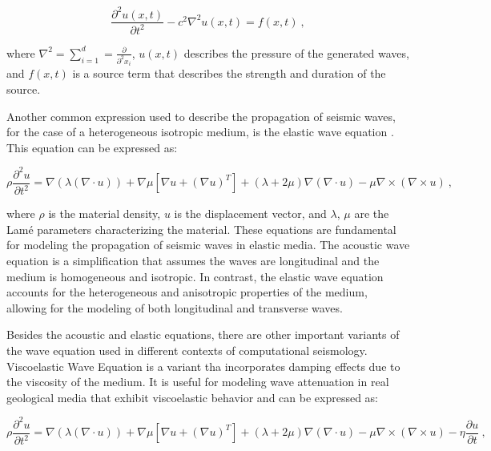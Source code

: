 \documentclass[11pt,twoside]{article}
\begin{document}
\begin{equation*}
\frac{\partial^2 u(x, t)}{\partial t^2} - c^{2} \nabla^2 u(x, t) = f(x, t) \ ,
\label{acoustic}
\end{equation*}

where $\nabla^2 = \sum_{i=1}^{d} = \frac{\partial}{\partial^{2} x_{i}}$, \( u(x, t) \) describes the pressure of 
the generated waves, and \( f(x, t) \) is a source term that describes the strength and duration of the source.

Another common expression used to describe the propagation of seismic waves, for the case of a heterogeneous 
isotropic medium, is the elastic wave equation \citep{moseley_fast_2018, lehmann_fourier_2023}. This equation can 
be expressed as:

\begin{equation*}
\rho \frac{\partial^2 u}{\partial t^2} = \nabla (\lambda (\nabla \cdot u)) + \nabla \mu \left[\nabla u 
+ (\nabla u)^T\right] + (\lambda + 2\mu) \nabla (\nabla \cdot u) - \mu \nabla \times (\nabla \times u) \ ,
\label{elastic}
\end{equation*}

where $\rho$ is the material density, $u$ is the displacement vector, and $\lambda$, $\mu$ are the Lamé parameters 
characterizing the material. These equations are fundamental for modeling the propagation of seismic waves in 
elastic media. The acoustic wave equation is a simplification that assumes the waves are longitudinal and the 
medium is homogeneous and isotropic. In contrast, the elastic wave equation accounts for the heterogeneous 
and anisotropic properties of the medium, allowing for the modeling of both longitudinal and transverse waves.

Besides the acoustic and elastic equations, there are other important variants of the wave equation used in different 
contexts of computational seismology. Viscoelastic Wave Equation is a variant tha incorporates damping effects due to 
the viscosity of the medium. It is useful for modeling wave attenuation in real geological media that exhibit 
viscoelastic behavior and can be expressed as:

\begin{equation*}
\rho \frac{\partial^2 u}{\partial t^2} = \nabla (\lambda (\nabla \cdot u)) + \nabla \mu \left[\nabla u + 
(\nabla u)^T\right] + (\lambda + 2\mu) \nabla (\nabla \cdot u) - \mu \nabla \times (\nabla \times u) - 
\eta \frac{\partial u}{\partial t} \ ,
\label{viscoelastic}
\end{equation*}
    
\end{document}
